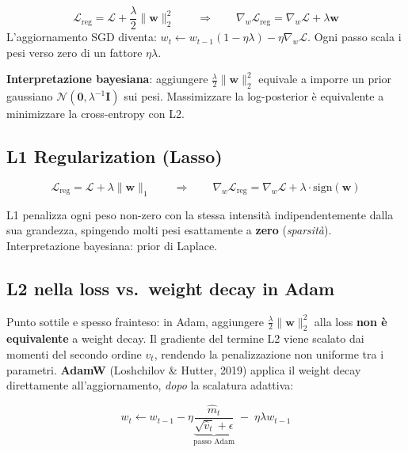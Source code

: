 \documentclass[
  11pt,
]{article}
\begin{document}
\begin{formulabox}[title={\textbf{L2 Regularization}}]
\[
\mathcal{L}_{\text{reg}} = \mathcal{L} + \frac{\lambda}{2}\|\mathbf{w}\|_2^2
\qquad \Rightarrow \qquad
\nabla_w \mathcal{L}_{\text{reg}} = \nabla_w \mathcal{L} + \lambda \mathbf{w}
\]
L'aggiornamento SGD diventa: $w_t \leftarrow w_{t-1}(1 - \eta\lambda) - \eta \nabla_w \mathcal{L}$. Ogni passo scala i pesi verso zero di un fattore $\eta\lambda$.
\end{formulabox}

\textbf{Interpretazione bayesiana}: aggiungere $\tfrac{\lambda}{2}\|\mathbf{w}\|_2^2$ equivale a imporre un prior gaussiano $\mathcal{N}(\mathbf{0}, \lambda^{-1}\mathbf{I})$ sui pesi. Massimizzare la log-posterior è equivalente a minimizzare la cross-entropy con L2.

\subsection{L1 Regularization (Lasso)}

\begin{formulabox}[title={\textbf{L1 Regularization}}]
\[
\mathcal{L}_{\text{reg}} = \mathcal{L} + \lambda\|\mathbf{w}\|_1
\qquad \Rightarrow \qquad
\nabla_w \mathcal{L}_{\text{reg}} = \nabla_w \mathcal{L} + \lambda \cdot \text{sign}(\mathbf{w})
\]
\end{formulabox}

L1 penalizza ogni peso non-zero con la stessa intensità indipendentemente dalla sua grandezza, spingendo molti pesi esattamente a \textbf{zero} (\emph{sparsità}). Interpretazione bayesiana: prior di Laplace.

\subsection{L2 nella loss vs.\ weight decay in Adam}

Punto sottile e spesso frainteso: in Adam, aggiungere $\tfrac{\lambda}{2}\|\mathbf{w}\|_2^2$ alla loss \textbf{non è equivalente} a weight decay. Il gradiente del termine L2 viene scalato dai momenti del secondo ordine $v_t$, rendendo la penalizzazione non uniforme tra i parametri. \textbf{AdamW} (Loshchilov \& Hutter, 2019) applica il weight decay direttamente all'aggiornamento, \emph{dopo} la scalatura adattiva:

\[
w_t \leftarrow w_{t-1} - \eta \underbrace{\frac{\hat{m}_t}{\sqrt{\hat{v}_t} + \epsilon}}_{\text{passo Adam}} \;-\; \eta \lambda w_{t-1}
\]
\end{document}
